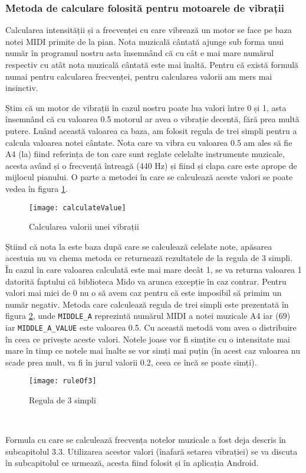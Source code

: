 \documentclass[../IoMusT.tex]{subfiles}
\begin{document}
\subsubsection{Metoda de calculare folosită pentru motoarele de vibrații}
Calcularea intensității și a frecvenței cu care vibrează un motor se face pe baza notei MIDI primite de la pian. Nota muzicală cântată ajunge sub forma unui număr în programul nostru asta însemnând că cu cât e mai mare numărul respectiv cu atât nota muzicală cântată este mai înaltă. Pentru că există formulă numai pentru calcularea frecvenței, pentru calcularea valorii am mers mai insinctiv.
\\
\par Știm că un motor de vibrații în cazul nostru poate lua valori între 0 și 1, asta însemnând că cu valoarea 0.5 motorul ar avea o vibrație decentă, fără prea multă putere. Luând această valoarea ca baza, am folosit regula de trei simpli pentru a calcula valoarea notei cântate. Nota care va vibra cu valoarea 0.5 am ales să fie A4 (la) fiind referința de ton care sunt reglate celelalte instrumente muzicale, acesta având și o frecvență întreagă (440 Hz) și fiind și clapa care este aprope de mijlocul pianului. O parte a metodei în care se calculează aceste valori se poate vedea în figura \ref{fig:calculateValue}.
\begin{figure}[h]
\centering
\texttt{[image: calculateValue]}
\caption{Calcularea valorii unei vibrații}
\label{fig:calculateValue}
\end{figure}  
 Știind că nota la este baza după care se calculează celelate note, apăsarea acestuia nu va chema metoda ce returnează rezultatele de la regula de 3 simpli. În cazul în care valoarea calculată este mai mare decât 1, se va returna valoarea 1 datorită faptului că biblioteca Mido va arunca excepție în caz contrar. Pentru valori mai mici de 0 nu o să avem caz pentru că este imposibil să primim un număr negativ. Metoda care calculează regula de trei simpli este prezentată în figura \ref{fig:ruleOf3}, unde \verb|MIDDLE_A| reprezintă numărul MIDI a notei muzicale A4 iar (69) iar \verb|MIDDLE_A_VALUE| este valoarea 0.5. Cu această metodă vom avea o distribuire în ceea ce privește aceste valori. Notele joase vor fi simțite cu o intensitate mai mare în timp ce notele mai înalte se vor simți mai puțin (în acest caz valoarea nu scade prea mult, va fi în jurul valorii 0.2, ceea ce încă se poate simți).
\begin{figure}[h]
\centering
\texttt{[image: ruleOf3]}
\caption{Regula de 3 simpli}
\label{fig:ruleOf3}
\end{figure}  
\\
\par Formula cu care se calculează frecvența notelor muzicale a fost deja descris în subcapitolul 3.3. Utilizarea acestor valori (înafară setarea vibrației) se va discuta în subcapitolul ce urmează, acesta fiind folosit și în aplicația Android.
\end{document}
